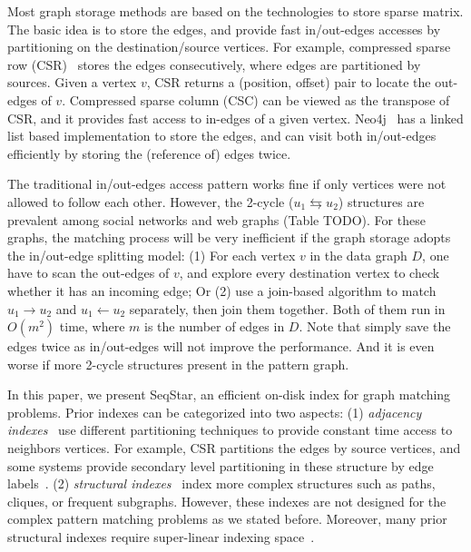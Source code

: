 Most graph storage methods are based on the technologies to store sparse matrix.
The basic idea is to store the edges, and provide fast in/out-edges accesses by partitioning on the destination/source vertices.
For example, compressed sparse row (CSR)~\cite{1447941} stores the edges consecutively, where edges are partitioned by sources.
Given a vertex $v$, CSR returns a (position, offset) pair to locate the out-edges of $v$.
Compressed sparse column (CSC) can be viewed as the transpose of CSR, and it provides fast access to in-edges of a given vertex.
Neo4j~\cite{Neo4j} has a linked list based implementation to store the edges, and can visit both in/out-edges efficiently by storing the (reference of) edges twice.

The traditional in/out-edges access pattern works fine if only vertices were not allowed to follow each other.
However, the 2-cycle ($u_1 \leftrightarrows u_2$) structures are prevalent among social networks and web graphs (Table TODO).
For these graphs, the matching process will be very inefficient if the graph storage adopts the in/out-edge splitting model:
(1) For each vertex $v$ in the data graph $D$, one have to scan the out-edges of $v$, and explore every destination vertex to check whether it has an incoming edge;
Or (2) use a join-based algorithm to match $u_1 \rightarrow u_2$ and $u_1 \leftarrow u_2$ separately, then join them together.
Both of them run in $O(m^2)$ time, where $m$ is the number of edges in $D$.
Note that simply save the edges twice as in/out-edges will not improve the performance.
And it is even worse if more 2-cycle structures present in the pattern graph.

In this paper, we present SeqStar, an efficient on-disk index for graph matching problems.
Prior indexes can be categorized into two aspects:
(1) \emph{adjacency indexes}~\cite{bonifati2018querying} use different partitioning techniques to provide constant time access to neighbors vertices.
For example, CSR partitions the edges by source vertices, and some systems provide secondary level partitioning in these structure by edge labels~\cite{DBLP:conf/icde/MhedhbiGKS21}.
(2) \emph{structural indexes}~\cite{DBLP:conf/europar/SumrallFPSVVW16,DBLP:journals/pvldb/LaiQLZC16,DBLP:journals/pvldb/ZhuQLYHY11} index more complex structures such as paths, cliques, or frequent subgraphs.
However, these indexes are not designed for the complex pattern matching problems as we stated before.
Moreover, many prior structural indexes require super-linear indexing space~\cite{DBLP:journals/pvldb/SunWWSL12}.

